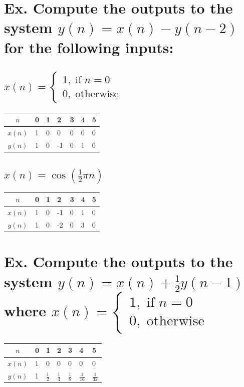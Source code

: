 \documentclass{article}
\renewcommand{\thesubsection}{\thesection.\alph{subsection}}
\begin{document}
\section[Example ~\thesection]{Ex. Compute the outputs to the system $y(n) = x(n) - y(n-2)$ for the following inputs:} 

\subsection[~\thesubsection]{$x(n) = \begin{cases} 1, \; \text{if} \; n = 0 \\ 0, \; \text{otherwise} \end{cases}$}

\begin{tabularx}{\linewidth}{| c || Y Y Y Y Y Y |}
	\hline
	$n$ & 0 & 1 & 2 & 3 & 4 & 5 \\
	\hline
	$x(n)$ & 1 & 0 & 0 & 0 & 0 & 0 \\
	$y(n)$ & 1 & 0 & -1 & 0 & 1 & 0 \\
	\hline
\end{tabularx}

\subsection[~\thesubsection]{$x(n) = \cos(\frac{1}{2}{\pi}n)$}

\begin{tabularx}{\linewidth}{| c || Y Y Y Y Y Y |}
	\hline
	$n$ & 0 & 1 & 2 & 3 & 4 & 5 \\
	\hline
	$x(n)$ & 1 & 0 & -1 & 0 & 1 & 0 \\
	$y(n)$ & 1 & 0 & -2 & 0 & 3 & 0 \\
	\hline
\end{tabularx}

\section[Example ~\thesection]{Ex. Compute the outputs to the system $y(n) = x(n) +\frac{1}{2}y(n-1)$ where $x(n) = \begin{cases} 1, \; \text{if} \; n = 0 \\ 0, \; \text{otherwise} \end{cases}$}

\begin{tabularx}{\linewidth}{| c || Y Y Y Y Y Y |}
	\hline
	$n$ & 0 & 1 & 2 & 3 & 4 & 5 \\
	\hline
	$x(n)$ & 1 & 0 & 0 & 0 & 0 & 0 \\
	$y(n)$ & 1 & $\tfrac{1}{2}$ & $\tfrac{1}{4}$ & $\tfrac{1}{8}$ & $\tfrac{1}{16}$ & $\tfrac{1}{32}$ \\
	\hline
\end{tabularx}
\end{document}
